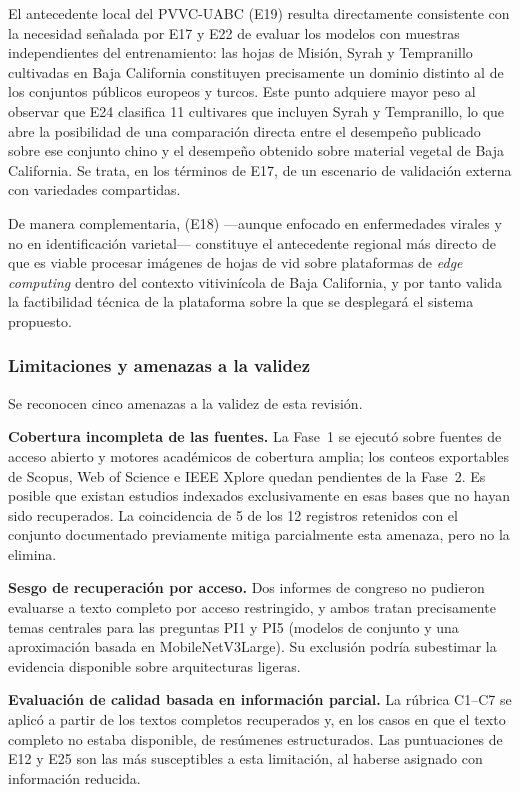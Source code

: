 El antecedente local del PVVC-UABC (E19) resulta directamente consistente con
la necesidad señalada por E17 y E22 de evaluar los modelos con muestras
independientes del entrenamiento: las hojas de Misión, Syrah y Tempranillo
cultivadas en Baja California constituyen precisamente un dominio distinto al
de los conjuntos públicos europeos y turcos. Este punto adquiere mayor peso
al observar que E24 clasifica 11 cultivares que incluyen Syrah y Tempranillo,
lo que abre la posibilidad de una comparación directa entre el desempeño
publicado sobre ese conjunto chino y el desempeño obtenido sobre material
vegetal de Baja California. Se trata, en los términos de E17, de un escenario
de validación externa con variedades compartidas.

De manera complementaria, \citet{lazcano2025} (E18) —aunque enfocado en
enfermedades virales y no en identificación varietal— constituye el
antecedente regional más directo de que es viable procesar imágenes de hojas
de vid sobre plataformas de \textit{edge computing} dentro del contexto
vitivinícola de Baja California, y por tanto valida la factibilidad técnica
de la plataforma sobre la que se desplegará el sistema propuesto.

\subsubsection{Limitaciones y amenazas a la validez}

Se reconocen cinco amenazas a la validez de esta revisión.

\textbf{Cobertura incompleta de las fuentes.} La Fase~1 se ejecutó sobre
fuentes de acceso abierto y motores académicos de cobertura amplia; los
conteos exportables de Scopus, Web of Science e IEEE Xplore quedan
pendientes de la Fase~2. Es posible que existan estudios indexados
exclusivamente en esas bases que no hayan sido recuperados. La coincidencia
de 5 de los 12 registros retenidos con el conjunto documentado previamente
mitiga parcialmente esta amenaza, pero no la elimina.

\textbf{Sesgo de recuperación por acceso.} Dos informes de congreso no
pudieron evaluarse a texto completo por acceso restringido, y ambos tratan
precisamente temas centrales para las preguntas PI1 y PI5 (modelos de
conjunto y una aproximación basada en MobileNetV3Large). Su exclusión podría
subestimar la evidencia disponible sobre arquitecturas ligeras.

\textbf{Evaluación de calidad basada en información parcial.} La rúbrica
C1--C7 se aplicó a partir de los textos completos recuperados y, en los casos
en que el texto completo no estaba disponible, de resúmenes estructurados.
Las puntuaciones de E12 y E25 son las más susceptibles a esta limitación, al
haberse asignado con información reducida.

